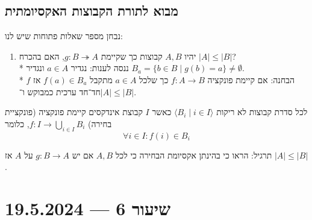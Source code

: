 \subsection{מבוא לתורת הקבוצות האקסיומתית}
נבחן מספר שאלות פתוחות שיש לנו:
\begin{enumerate}
	\item יהיו $A, B$ קבוצות כך שקיימת $g : B \twoheadrightarrow A$, האם בהכרח $|A| \le |B|$? \\*
		ננסה לענות: נגדיר $a \in A$ ונגדיר $B_a = \{ b \in B \mid g(b) = a \} \ne \emptyset$. \\*
		הבחנה: אם קיימת פונקציה $f : A \to B$ כך שלכל $a \in A$ מתקבל $f(a) \in B_a$ אז $f$ חד־חד ערכית כמבוקש ו־$|A| \le |B|$.
\end{enumerate}
\begin{definition}
	לכל סדרת קבוצות לא ריקות $\langle B_i \mid i \in I \rangle$ כאשר $I$ קבוצת אינדקסים קיימת פונקציה (פונקציית בחירה) $f : I \to \bigcup_{i \in I} B_i$, כלומר
	\[
		\forall i \in I : f(i) \in B_i
	\]
\end{definition}
תרגיל:
הראו כי בהינתן אקסיומת הבחירה כי לכל $A, B$ אם יש $g : B \to A$ על $A$ אז $|A| \le |B|$.

\section{שיעור 6 --- 19.5.2024}
